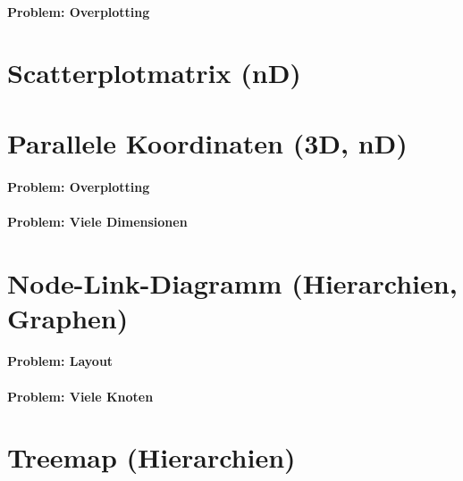 \documentclass[a4paper, 11pt, accentcolor = tud3b]{tudreport}
\begin{document}
			\paragraph{Problem: Overplotting} %

		\section{Scatterplotmatrix (nD)} %

		\section{Parallele Koordinaten (3D, nD)} %

			\paragraph{Problem: Overplotting} %

			\paragraph{Problem: Viele Dimensionen} %

		\section{Node-Link-Diagramm (Hierarchien, Graphen)} %

			\paragraph{Problem: Layout} %

			\paragraph{Problem: Viele Knoten} %

		\section{Treemap (Hierarchien)} %
\end{document}

